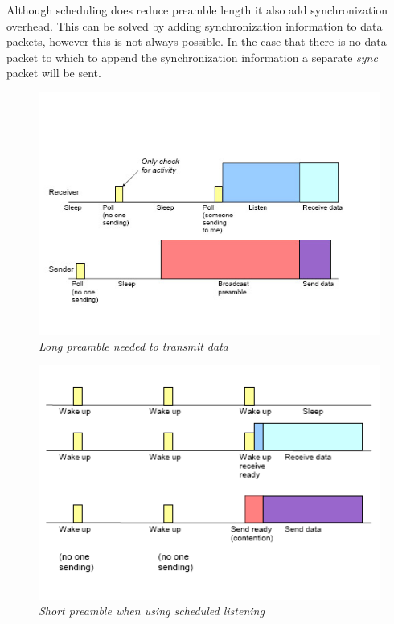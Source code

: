 Although scheduling does reduce preamble length it also add synchronization
overhead. This can be solved by adding synchronization information to data
packets, however this is not always possible. In the case that there is no data
packet to which to append the synchronization information a separate
\emph{sync} packet will be sent.

\clearpage

\begin{figure}[ht]
	\begin{center}
		\includegraphics[scale=0.9]{img/scp_long_preambles.jpg}
	\end{center}
	\caption{\small \itshape{Long preamble needed to transmit
	data\protect\footnotemark}}
	\label{fig:scp_long_preambles}
\end{figure}

\begin{figure}[ht]
	\begin{center}
		\includegraphics[scale=0.9]{img/scp_short_preambles.jpg}
	\end{center}
	\caption{\small \itshape{Short preamble when using scheduled 
	listening\protect\footnotemark}}
	\label{fig:scp_short_preambles}
\end{figure}

